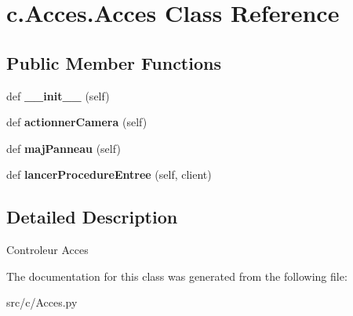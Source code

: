 \hypertarget{classc_1_1_acces_1_1_acces}{}\section{c.\+Acces.\+Acces Class Reference}
\label{classc_1_1_acces_1_1_acces}
\subsection*{Public Member Functions}
\begin{DoxyCompactItemize}
\item 
\hypertarget{classc_1_1_acces_1_1_acces_a351e3d6b219a30758e9d74f69291ce9a}{}def {\bfseries \+\_\+\+\_\+init\+\_\+\+\_\+} (self)\label{classc_1_1_acces_1_1_acces_a351e3d6b219a30758e9d74f69291ce9a}

\item 
\hypertarget{classc_1_1_acces_1_1_acces_a5c206a694505b4cae0b54a475f5481d0}{}def {\bfseries actionner\+Camera} (self)\label{classc_1_1_acces_1_1_acces_a5c206a694505b4cae0b54a475f5481d0}

\item 
\hypertarget{classc_1_1_acces_1_1_acces_a302a077a41309fef731ba8161084e795}{}def {\bfseries maj\+Panneau} (self)\label{classc_1_1_acces_1_1_acces_a302a077a41309fef731ba8161084e795}

\item 
\hypertarget{classc_1_1_acces_1_1_acces_a67051a248354f5cbdbdd4b49757a88d2}{}def {\bfseries lancer\+Procedure\+Entree} (self, client)\label{classc_1_1_acces_1_1_acces_a67051a248354f5cbdbdd4b49757a88d2}

\end{DoxyCompactItemize}


\subsection{Detailed Description}
\begin{DoxyVerb}Controleur Acces
\end{DoxyVerb}
 

The documentation for this class was generated from the following file\+:\begin{DoxyCompactItemize}
\item 
src/c/Acces.\+py\end{DoxyCompactItemize}
